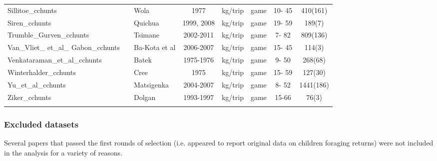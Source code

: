 \begin{landscape}
\begin{longtable}{M{2.6cm} M{3.6cm} M{1.5cm} c c M{1cm} c c}
Sillitoe\_cchunts              & \cite{sillitoe_managing_2004}             & Wola            & 1977       & kg/trip   & game               & 10- 45  & 410(161)    \\
Siren\_cchunts                 & \cite{siren_effects_2016}                 & Quichua         & 1999, 2008 & kg/trip   & game               & 19- 59  & 189(7)      \\
Trumble\_Gurven\_cchunts        & \cite{gurven_how_2006}                    & Tsimane         & 2002-2011  & kg/trip   & game               & 7- 82   & 809(136)    \\
Van\_Vliet\_ et\_al\_ Gabon\_cchunts & \cite{van_vliet_hunting_2008}             & Ba-Kota et al   & 2006-2007  & kg/trip   & game               & 15- 45  & 114(3)      \\
Venkataraman\_et\_al\_cchunts    & \cite{endicott_hunting_1979}              & Batek           & 1975-1976  & kg/trip   & game               & 9- 50   & 268(68)     \\
Winterhalder\_cchunts          & \cite{winterhalder_boreal_1983}           & Cree            & 1975       & kg/trip   & game               & 15- 59  & 127(30)     \\
Yu\_et\_al\_cchunts              & \cite{ohl-schacherer_sustainability_2007} & Matsigenka      & 2004-2007  & kg/trip   & game               & 8- 52   & 1441(186)   \\
Ziker\_cchunts                 & \cite{ziker_peoples_2002}                 & Dolgan          & 1993-1997 & kg/trip   & game               & 15-66  & 76(3)     \\ 
\renewcommand{\tablename}{Table S}
\label{tab:metadata}
\end{longtable}
\end{landscape}


\subsubsection{Excluded datasets} \label{SI:excluded}

Several papers that passed the first rounds of selection (i.e. appeared to report original data on children foraging returns) were not included in the analysis for a variety of reasons. 

